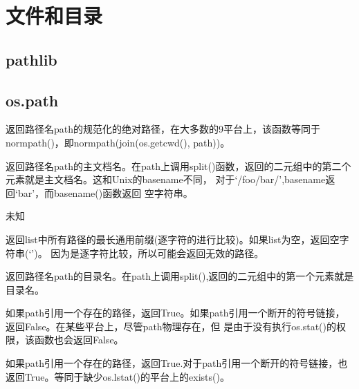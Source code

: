 \chapter{文件和目录}
\section{pathlib}






\section{os.path}
\noindent{\color{red}{os.path.abspath(path):}}
\par{返回路径名path的规范化的绝对路径，在大多数的9平台上，该函数等同于normpath()，即normpath(join(os.getcwd(), path))。}\\

\noindent{\color{red}{os.path.basename(path):}}
\par{返回路径名path的主文档名。在path上调用split()函数，返回的二元组中的第二个元素就是主文档名。这和Unix的basename不同，
  对于\textquoteleft{/foo/bar/}\textquoteright{},basename返回\textquoteleft{bar}\textquoteright{}，而basename()函数返回
  空字符串。}\\

\noindent{\color{red}{os.path.commonpath(paths):}}
\par{未知}\\

\noindent{\color{red}{os.path.commonprefix(list):}}
\par{返回list中所有路径的最长通用前缀(逐字符的进行比较)。如果list为空，返回空字符串(\textquoteleft{}\textquoteright{})。
  因为是逐字符比较，所以可能会返回无效的路径。}\\

\noindent{\color{red}{os.path.dirname(path):}}
\par{返回路径名path的目录名。在path上调用split(),返回的二元组中的第一个元素就是目录名。}\\

\noindent{\color{red}{os.path.exists(path):}}
\par{如果path引用一个存在的路径，返回True。如果path引用一个断开的符号链接，返回False。在某些平台上，尽管path物理存在，但
  是由于没有执行os.stat()的权限，该函数也会返回False。}\\

\noindent{\color{red}{os.path.lexists(path):}}
\par{如果path引用一个存在的路径，返回True.对于path引用一个断开的符号链接，也返回True。等同于缺少os.lstat()的平台上的exists()。}\\


